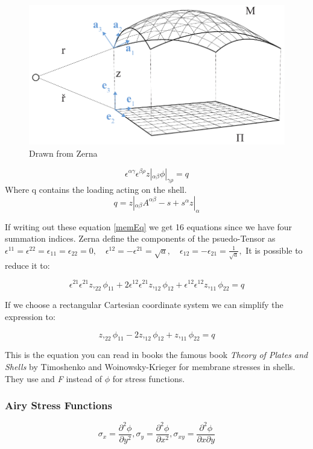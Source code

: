 \begin{figure}[H]
\centering
\includegraphics[width=0.9\linewidth ]{figure/Theory/planeShell.pdf}
\caption{Drawn from Zerna }
\end{figure}


\begin{equation}\label{memEq}
\epsilon^{\alpha \gamma}\epsilon^{\beta \rho} z|_{\alpha \beta}\phi|_{\gamma \rho} = q
\end{equation}
Where q contains the loading acting on the shell. 
\begin{equation}
q = z|_{\alpha \beta}A^{\alpha \beta} - s + s^\alpha z |_\alpha
\end{equation}

If writing out these equation \ref{memEq} we get 16 equations since we have four summation indices. Zerna define the components of the  psuedo-Tensor as $\epsilon^{11} = \epsilon^{22}=\epsilon_{11}=\epsilon_{22} = 0,\quad \epsilon^{12} = -\epsilon^{21} = \sqrt{a},\quad \epsilon_{12} = -\epsilon_{21} = \frac{1}{\sqrt{a}},$ It is possible to reduce it to:

\begin{equation}
    \epsilon^{21}\epsilon^{21}z,_{22}\phi_{11} + 2\epsilon^{12}\epsilon^{21}z,_{12}\phi_{12} + \epsilon^{12}\epsilon^{12}z,_{11}\phi_{22} = q
\end{equation}

If we choose a rectangular Cartesian coordinate system we can simplify the expression to:

\begin{equation}
    z,_{22}\phi_{11} -2 z,_{12}\phi_{12} + z,_{11}\phi_{22} = q
\end{equation}

This is the equation you can read in books the famous book \textit{Theory of Plates and Shells} by Timoshenko and Woinowsky-Krieger for membrane stresses in shells. They use and \textit{F} instead of $\phi$ for stress functions.

\subsubsection{Airy Stress Functions}

    
\begin{equation}
\sigma_x = \frac{\partial^2\phi}{\partial y^2}, \sigma_y = \frac{\partial^2\phi}{\partial x^2}, \sigma_{xy} = \frac{\partial^2\phi}{\partial x \partial y}
\end{equation}

